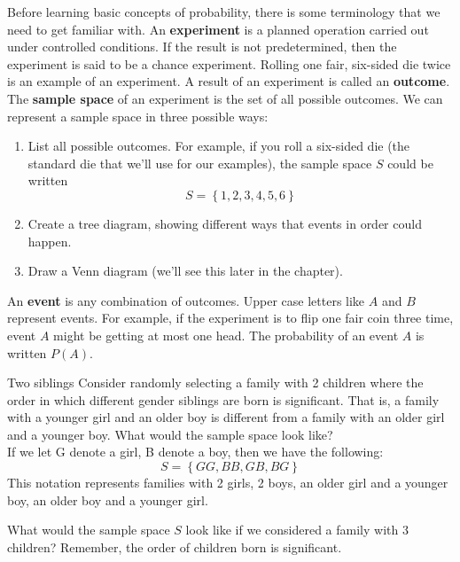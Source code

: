 \setcounter{ExampleCounter}{1}
Before learning basic concepts of probability, there is some terminology that we need to get familiar with. 
An \textbf{experiment} is a planned operation carried out under controlled conditions. If the result is not predetermined, then the
experiment is said to be a chance experiment. Rolling one fair, six-sided die twice is an example of an experiment.
A result of an experiment is called an \textbf{outcome}. The \textbf{sample space} of an experiment is the set of all possible outcomes.
We can represent a sample space in three possible ways: 
\begin{enumerate}
\item List all possible outcomes.  For example, if you roll a six-sided die (the standard die that we'll use for our examples), the sample space $S$ could be written \[S = \left\{1, 2, 3, 4, 5, 6 \right\}\]
\item Create a tree diagram, showing different ways that events in order could happen.
\item Draw a Venn diagram (we'll see this later in the chapter).
\end{enumerate}

An \textbf{event} is any combination of outcomes. Upper case letters like $A$ and $B$ represent events. For example, if the experiment
is to flip one fair coin three time, event $A$ might be getting at most one head. The probability of an event $A$ is written $P(A)$. 

\begin{example}[https://www.youtube.com/watch?v=dZda3xN2W_g]{Two siblings}
Consider randomly selecting a family with 2 children where the order in which different gender siblings are born is significant. That is, a family with a younger girl and an older boy is different from a family with an older girl and a younger boy. What would the sample space look like? \\

 If we let G denote a girl, B denote a boy, then we have the following:
\[  S = \left\{ GG, BB, GB, BG \right\} \]
This notation represents families with 2 girls, 2 boys, an older girl and a younger boy, an older boy and a younger girl. 
\end{example}

\begin{try}
What would the sample space $S$ look like if we considered a family with 3 children? Remember, the order of children born is significant. 
\end{try}

